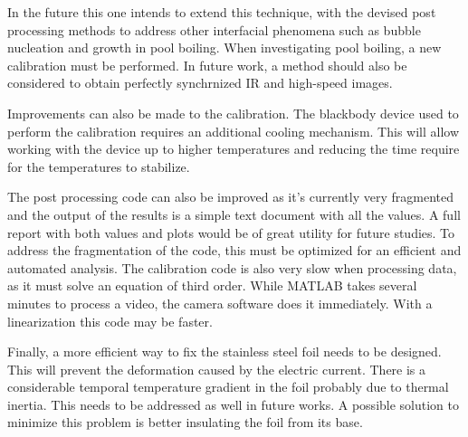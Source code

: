 \par In the future this one intends to extend this technique, with the devised post processing methods to address other interfacial phenomena such as bubble nucleation and growth in pool boiling. When investigating pool boiling, a new calibration must be performed. 
In future work, a method should also be considered to obtain perfectly synchrnized IR and high-speed images.\\
\par Improvements can also be made to the calibration. The blackbody device used to perform the calibration requires an additional cooling mechanism. This will allow working with the device up to higher temperatures and reducing the time require for the temperatures to stabilize. 
\par The post processing code can also be improved as it's currently very fragmented and the output of the results is a simple text document with all the values. A full report with both values and plots would be of great utility for future studies. To address the fragmentation of the code, this must be optimized for an efficient and automated analysis. The calibration code is also very slow when processing data, as it must solve an equation of third order. While MATLAB takes several minutes to process a video, the camera software does it immediately. With a linearization this code may be faster.\\
\par Finally, a more efficient way to fix the stainless steel foil needs to be designed. This will prevent the deformation caused by the electric current. There is a considerable temporal temperature gradient in the foil probably due to thermal inertia. This needs to be addressed as well in future works. A possible solution to minimize this problem is better insulating the foil from its base. 

\cleardoublepage
















